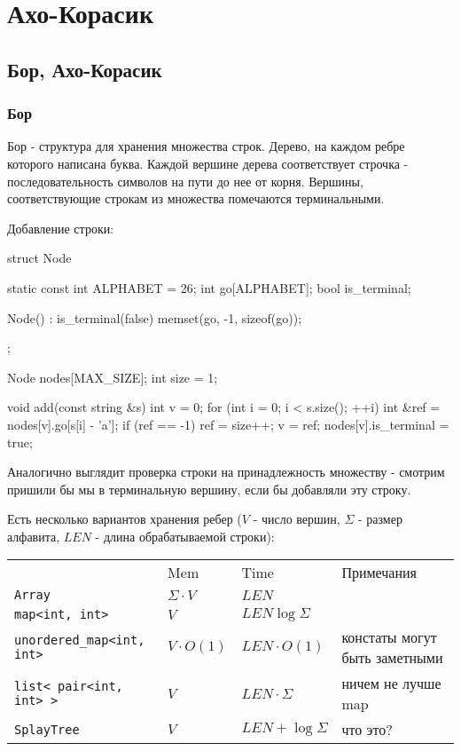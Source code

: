 \chapter{Ахо-Корасик}

\section{Бор, Ахо-Корасик}

\subsection{Бор}

Бор - структура для хранения множества строк. Дерево, на каждом ребре которого написана буква. Каждой вершине дерева соответствует строчка - последовательность символов на пути до нее от корня. Вершины, соответствующие строкам из множества помечаются терминальными. 

Добавление строки:

\begin{cppcode}
struct Node {
    static const int ALPHABET = 26;
    int go[ALPHABET];
    bool is_terminal;
    
    Node() : is_terminal(false) {
        memset(go, -1, sizeof(go));
    }
};

Node nodes[MAX_SIZE];
int size = 1;

void add(const string &s) {
    int v = 0;
    for (int i = 0; i < s.size(); ++i) {
        int &ref = nodes[v].go[s[i] - 'a'];
        if (ref == -1)
            ref = size++;
        v = ref; 	
    }
    nodes[v].is_terminal = true;
}
\end{cppcode}

Аналогично выглядит проверка строки на принадлежность множеству - смотрим пришили бы мы в терминальную вершину, если бы добавляли эту строку.

Есть несколько вариантов хранения ребер ($V$ - число вершин, $\Sigma$ - размер алфавита, $LEN$ - длина обрабатываемой строки):

\begin{tabular}[c]{llll}
& Mem & Time & Примечания \\
\texttt{Array} & $\Sigma \cdot V$ & $LEN$ &  \\
\texttt{map<int, int>} & $V$ & $LEN \log \Sigma$ & \\
\texttt{unordered\_map<int, int>} & $V \cdot O(1)$ & $LEN \cdot O(1)$ & констаты могут быть заметными \\
\texttt{list< pair<int, int> >} & $V$ & $LEN \cdot \Sigma$ & ничем не лучше map \\
\texttt{SplayTree} & $V$ & $LEN + \log \Sigma$ & что это?\\
\end{tabular}

